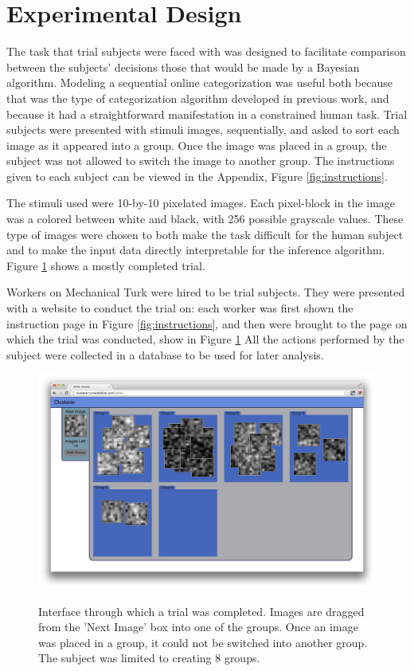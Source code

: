 \section*{Experimental Design}
The task that trial subjects were faced with was designed to facilitate
comparison between the subjects' decisions those that would be made by a
Bayesian algorithm. Modeling a sequential online categorization was useful both
because that was the type of categorization algorithm developed in previous
work, and because it had a straightforward manifestation in a constrained human
task. Trial subjects were presented with stimuli images, sequentially, and asked
to sort each image as it appeared into a group. Once the image was placed in a
group, the subject was not allowed to switch the image to another group.  The
instructions given to each subject can be viewed in the Appendix, Figure
\ref{fig:instructions}. 

The stimuli used were 10-by-10 pixelated images. Each pixel-block in the image
was a colored between white and black, with 256 possible grayscale values. These
type of images were chosen to both make the task difficult for the human subject and
to make the input data directly interpretable for the inference algorithm.
Figure \ref{fig:clusterer} shows a mostly completed trial.

Workers on Mechanical Turk were hired to be trial subjects. They were presented
with a website to conduct the trial on: each worker was first shown the
instruction page in Figure \ref{fig:instructions}, and then were brought to the
page on which the trial was conducted, show in Figure \ref{fig:clusterer}  All
the actions performed by the subject were collected in a database to be used for
later analysis.

\begin{figure}
\centering
\includegraphics[width=5.6in]{img/clusterer.png}
\label{fig:clusterer}
\caption{Interface through which a trial was completed. Images are dragged from
  the 'Next Image' box into one of the groups. Once an image was placed in a
  group, it could not be switched into another group.  The subject was limited
  to creating 8 groups.}
\end{figure}
